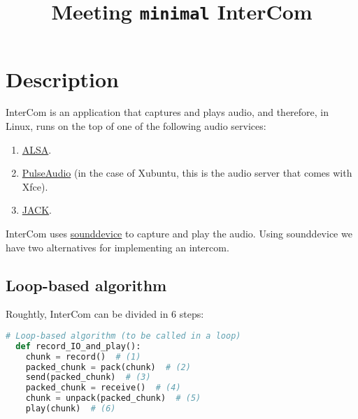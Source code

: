 \title{Meeting \texttt{minimal} InterCom}

\maketitle

\section{Description}

InterCom is an application that captures and plays audio, and therefore, in Linux, runs on the top of one of the following audio services:
\begin{enumerate}
\item \href{https://vicente-gonzalez-ruiz.github.io/ALSA/}{ALSA}.
\item
  \href{https://vicente-gonzalez-ruiz.github.io/PulseAudio/}{PulseAudio}
  (in the case of Xubuntu, this is the audio server that comes with
  Xfce).
\item \href{https://vicente-gonzalez-ruiz.github.io/JACK/}{JACK}.
\end{enumerate}

InterCom uses
\href{https://vicente-gonzalez-ruiz.github.io/intro_to_sounddevice/}{sounddevice}
to capture and play the audio. Using sounddevice we have two alternatives for implementing an intercom.

\subsection{Loop-based algorithm}

Roughtly, InterCom can be divided in 6 steps:

\begin{lstlisting}[language=Python]
  # Loop-based algorithm (to be called in a loop)
  def record_IO_and_play():
    chunk = record()  # (1)
    packed_chunk = pack(chunk)  # (2)
    send(packed_chunk)  # (3)
    packed_chunk = receive()  # (4)
    chunk = unpack(packed_chunk)  # (5)
    play(chunk)  # (6)
\end{lstlisting}


